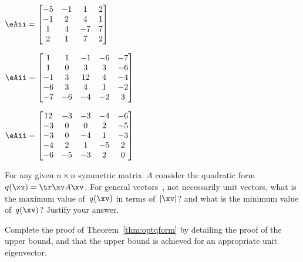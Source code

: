 \begin{exercise}
\begin{parts}
\item \(\eAii=\begin{bmatrix} -5&-1&1&2
\\-1&2&4&1
\\1&4&-7&7
\\2&1&7&2 \end{bmatrix}\)

\item \(\eAii=\begin{bmatrix} 1&1&-1&-6&-7
\\1&0&3&3&-6
\\-1&3&12&4&-4
\\-6&3&4&1&-2
\\-7&-6&-4&-2&3 \end{bmatrix}\)

\item \(\eAii=\begin{bmatrix} 12&-3&-3&-4&-6
\\-3&0&0&2&-5
\\-3&0&-4&1&-3
\\-4&2&1&-5&2
\\-6&-5&-3&2&0 \end{bmatrix}\)


\end{parts}
\end{exercise}







\begin{exercise} \label{ex:} 
For any given \(n\times n\) symmetric matrix~\(A\) consider the quadratic form \(q(\xv)=\tr\xv A\xv\). 
For general vectors~\xv, not necessarily unit vectors, what is the maximum value of~\(q(\xv)\) in terms of~\(|\xv|\)? and what is the minimum value of~\(q(\xv)\)?  
Justify your answer.
\end{exercise}





\begin{exercise} \label{ex:optqform} 
Complete the proof of Theorem~\ref{thm:optqform} by detailing the proof of the upper bound, and that the upper bound is achieved for an appropriate unit eigenvector.
\end{exercise}




